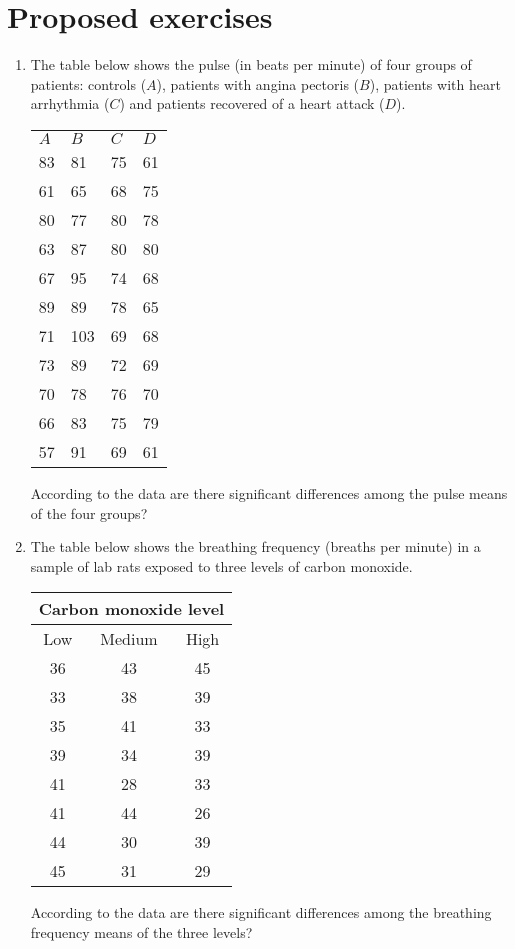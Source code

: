 \section{Proposed exercises}
\begin{enumerate}[leftmargin=*]
\item The table below shows the pulse (in beats per minute) of four groups of patients: controls ($A$), patients with 
angina pectoris ($B$), patients with heart arrhythmia ($C$) and patients recovered of a heart attack ($D$).

\begin{center}
\begin{tabular}{llll}
\toprule
$A$ & $B$ & $C$ & $D$ \\
83 & 81 & 75 & 61 \\
61 & 65 & 68 & 75 \\
80 & 77 & 80 & 78 \\
63 & 87 & 80 & 80 \\
67 & 95 & 74 & 68 \\
89 & 89 & 78 & 65 \\
71 & 103 & 69 & 68 \\
73 & 89 & 72 & 69 \\
70 & 78 & 76 & 70 \\
66 & 83 & 75 & 79 \\
57 & 91 & 69 & 61 \\
\bottomrule
\end{tabular}
\end{center}

According to the data are there significant differences among the pulse means of the four groups?


\item The table below shows the breathing frequency (breaths per minute) in a sample of lab rats exposed to three
levels of carbon monoxide.

\begin{center}
\begin{tabular}{ccc}
\multicolumn{3}{c}{Carbon monoxide level}\\
\toprule
Low & Medium & High\\
36 & 43 & 45 \\
33 & 38 & 39 \\
35 & 41 & 33 \\
39 & 34 & 39 \\
41 & 28 & 33 \\
41 & 44 & 26 \\
44 & 30 & 39 \\
45 & 31 & 29 \\
\bottomrule
\end{tabular}
\end{center}

According to the data are there significant differences among the breathing frequency means of the three levels?
\end{enumerate}
